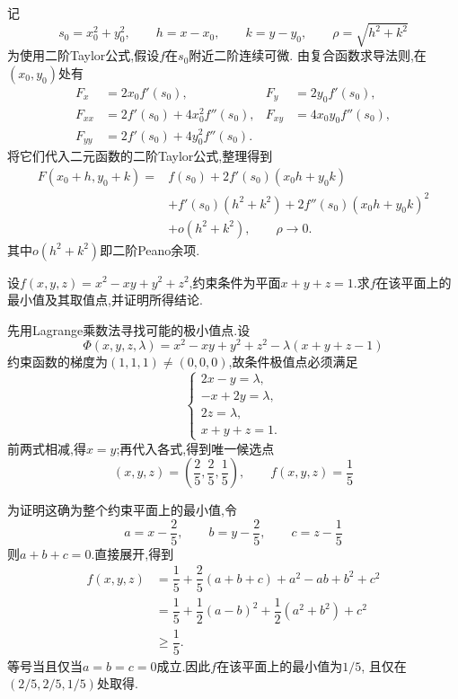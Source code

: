 \documentclass{ctexart}
\begin{document}
\begin{solution}
记
\[s_0=x_0^2+y_0^2,\qquad h=x-x_0,\qquad k=y-y_0,\qquad \rho=\sqrt{h^2+k^2}\]
为使用二阶Taylor公式,假设$f$在$s_0$附近二阶连续可微.
由复合函数求导法则,在$(x_0,y_0)$处有
\[\begin{aligned}
F_x&=2x_0f'(s_0),&F_y&=2y_0f'(s_0),\\
F_{xx}&=2f'(s_0)+4x_0^2f''(s_0),&
F_{xy}&=4x_0y_0f''(s_0),\\
F_{yy}&=2f'(s_0)+4y_0^2f''(s_0).
\end{aligned}\]
将它们代入二元函数的二阶Taylor公式,整理得到
\[\begin{aligned}
F(x_0+h,y_0+k)
={}&f(s_0)+2f'(s_0)(x_0h+y_0k)\\
&+f'(s_0)(h^2+k^2)+2f''(s_0)(x_0h+y_0k)^2\\
&+o(h^2+k^2),\qquad \rho\to0.
\end{aligned}\]
其中$o(h^2+k^2)$即二阶Peano余项.
\end{solution}
\begin{problem}[8.]
设$f(x,y,z)=x^2-xy+y^2+z^2$,约束条件为平面$x+y+z=1$.求$f$在该平面上的最小值及其取值点,并证明所得结论.
\end{problem}
\begin{solution}
先用Lagrange乘数法寻找可能的极小值点.设
\[\Phi(x,y,z,\lambda)=x^2-xy+y^2+z^2-\lambda(x+y+z-1)\]
约束函数的梯度为$(1,1,1)\ne(0,0,0)$,故条件极值点必须满足
\[\begin{cases}
2x-y=\lambda,\\
-x+2y=\lambda,\\
2z=\lambda,\\
x+y+z=1.
\end{cases}\]
前两式相减,得$x=y$;再代入各式,得到唯一候选点
\[(x,y,z)=\left(\dfrac25,\dfrac25,\dfrac15\right),\qquad f(x,y,z)=\dfrac15\]

为证明这确为整个约束平面上的最小值,令
\[a=x-\dfrac25,\qquad b=y-\dfrac25,\qquad c=z-\dfrac15\]
则$a+b+c=0$.直接展开,得到
\[\begin{aligned}
f(x,y,z)
&=\dfrac15+\dfrac25(a+b+c)+a^2-ab+b^2+c^2\\
&=\dfrac15+\dfrac12(a-b)^2+\dfrac12(a^2+b^2)+c^2\\
&\geqslant\dfrac15.
\end{aligned}\]
等号当且仅当$a=b=c=0$成立.因此$f$在该平面上的最小值为$1/5$,
且仅在$\left(2/5,2/5,1/5\right)$处取得.
\end{solution}
\end{document}

